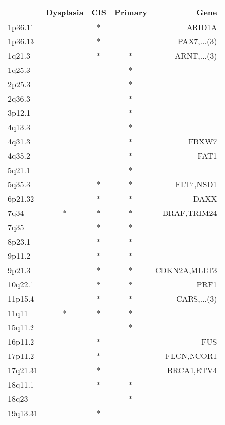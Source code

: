 \begin{tabular}{lcccr}
\toprule
{} & Dysplasia & CIS & Primary &          Gene \\
\midrule
1p36.11  &           &   * &         &        ARID1A \\
1p36.13  &           &   * &         &   PAX7,...(3) \\
1q21.3   &           &   * &       * &   ARNT,...(3) \\
1q25.3   &           &     &       * &               \\
2p25.3   &           &     &       * &               \\
2q36.3   &           &     &       * &               \\
3p12.1   &           &     &       * &               \\
4q13.3   &           &     &       * &               \\
4q31.3   &           &     &       * &         FBXW7 \\
4q35.2   &           &     &       * &          FAT1 \\
5q21.1   &           &     &       * &               \\
5q35.3   &           &   * &       * &     FLT4,NSD1 \\
6p21.32  &           &   * &       * &          DAXX \\
7q34     &         * &   * &       * &   BRAF,TRIM24 \\
7q35     &           &   * &       * &               \\
8p23.1   &           &   * &       * &               \\
9p11.2   &           &   * &       * &               \\
9p21.3   &           &   * &       * &  CDKN2A,MLLT3 \\
10q22.1  &           &   * &       * &          PRF1 \\
11p15.4  &           &   * &       * &   CARS,...(3) \\
11q11    &         * &   * &       * &               \\
15q11.2  &           &     &       * &               \\
16p11.2  &           &   * &         &           FUS \\
17p11.2  &           &   * &         &    FLCN,NCOR1 \\
17q21.31 &           &   * &         &    BRCA1,ETV4 \\
18q11.1  &           &   * &       * &               \\
18q23    &           &     &       * &               \\
19q13.31 &           &   * &         &               \\
\bottomrule
\end{tabular}
